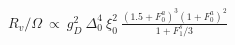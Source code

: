 $\displaystyle R_v/\Omega\ \propto\ g_D^2\ \Delta_0^4\ \xi_0^2\ \frac{(1.5+F_0^a)^3(1+F_0^a)^2}{1+F_1^s/3}$